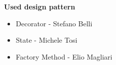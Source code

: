 \documentclass{article}
\begin{document}
\textbf{Used design pattern}

\begin{itemize}
	\item Decorator - Stefano Belli
	\item State - Michele Tosi
	\item Factory Method - Elio Magliari
\end{itemize}
\end{document}
